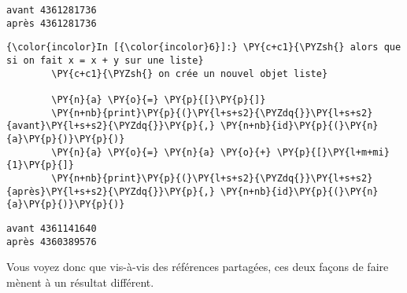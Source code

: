     \begin{Verbatim}[commandchars=\\\{\}]
avant 4361281736
après 4361281736

    \end{Verbatim}

    \begin{Verbatim}[commandchars=\\\{\}]
{\color{incolor}In [{\color{incolor}6}]:} \PY{c+c1}{\PYZsh{} alors que si on fait x = x + y sur une liste}
        \PY{c+c1}{\PYZsh{} on crée un nouvel objet liste}
        
        \PY{n}{a} \PY{o}{=} \PY{p}{[}\PY{p}{]}
        \PY{n+nb}{print}\PY{p}{(}\PY{l+s+s2}{\PYZdq{}}\PY{l+s+s2}{avant}\PY{l+s+s2}{\PYZdq{}}\PY{p}{,} \PY{n+nb}{id}\PY{p}{(}\PY{n}{a}\PY{p}{)}\PY{p}{)}
        \PY{n}{a} \PY{o}{=} \PY{n}{a} \PY{o}{+} \PY{p}{[}\PY{l+m+mi}{1}\PY{p}{]}
        \PY{n+nb}{print}\PY{p}{(}\PY{l+s+s2}{\PYZdq{}}\PY{l+s+s2}{après}\PY{l+s+s2}{\PYZdq{}}\PY{p}{,} \PY{n+nb}{id}\PY{p}{(}\PY{n}{a}\PY{p}{)}\PY{p}{)}
\end{Verbatim}


    \begin{Verbatim}[commandchars=\\\{\}]
avant 4361141640
après 4360389576

    \end{Verbatim}

    Vous voyez donc que vis-à-vis des références partagées, ces deux façons
de faire mènent à un résultat différent.


    
    
    
